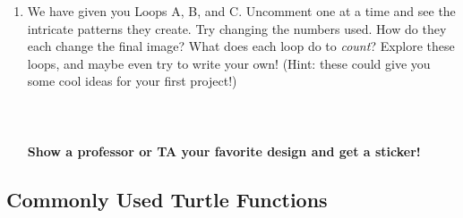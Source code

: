 \documentclass[11pt, letterpaper, onecolumn, oneside, final]{article}
\begin{document}
\begin{enumerate}
\item We have given you Loops A, B, and C. Uncomment one at a time and see the intricate patterns they create. Try changing the numbers used. How do they each change the final image? What does each loop do to \emph{count}? Explore these loops, and maybe even try to write your own! (Hint: these could give you some cool ideas for your first project!)\\\\\\\\
\textbf{Show a professor or TA your favorite design and get a sticker!}
\end{enumerate}

\newpage
\begin{center}
\section{Commonly Used Turtle Functions}
\end{center}
\end{document}
